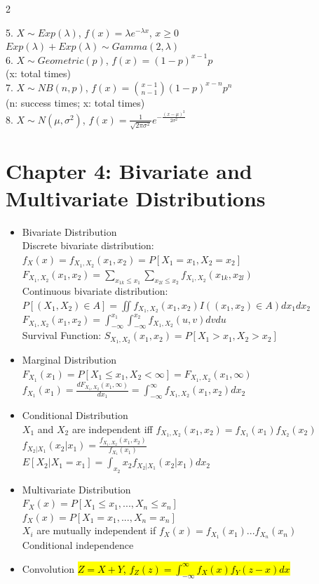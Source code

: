 \documentclass[a4paper,10pt]{article}
\begin{document}
\begin{multicols}{2}
\begin{itemize}
    5. $X\sim Exp(\lambda)$, $f(x)=\lambda e^{-\lambda x}$, $x\ge 0$\\
    $Exp(\lambda)+Exp(\lambda)\sim Gamma(2,\lambda)$\\
    6. $X\sim Geometric(p)$, $f(x)=(1-p)^{x-1}p$\\(x: total times)\\
    7. $X\sim NB(n,p)$, $f(x)=\binom{x-1}{n-1}(1-p)^{x-n}p^n$\\(n: success times; x: total times)\\
    8. $X\sim N(\mu,\sigma^2)$, $f(x)=\frac{1}{\sqrt{2\pi \sigma^2}}e^{-\frac{(x-\mu)^2}{2\sigma^2}}$
\end{itemize}

\section*{Chapter 4: Bivariate and Multivariate Distributions}
\begin{itemize}
    \item Bivariate Distribution\\
    Discrete bivariate distribution: $f_X(x)=f_{X_1,X_2}(x_1,x_2)=P[X_1=x_1,X_2=x_2]$\\
    $F_{X_1,X_2}(x_1,x_2)=\sum_{x_{1k}\le x_1}\sum_{x_{2l}\le x_2}f_{X_1,X_2}(x_{1k},x_{2l})$\\
    Continuous bivariate distribution: $P[(X_1,X_2)\in A]=\iint f_{X_1,X_2}(x_1,x_2)I((x_1,x_2)\in A)dx_1dx_2$\\
    $F_{X_1,X_2}(x_1,x_2)=\int_{-\infty}^{x_1} \int_{-\infty}^{x_2} f_{X_1,X_2}(u,v)dvdu$\\
    Survival Function: $S_{X_1,X_2}(x_1,x_2)=P[X_1>x_1,X_2>x_2]$
    \item Marginal Distribution\\
    $F_{X_1}(x_1)=P[X_1\le x_1,X_2<\infty]=F_{X_1,X_2}(x_1,\infty)$\\
    $f_{X_1}(x_1)=\frac{dF_{X_1,X_2}(x_1,\infty)}{dx_1}=\int_{-\infty}^{\infty}f_{X_1,X_2}(x_1,x_2)dx_2$
    \item Conditional Distribution\\
    $X_1$ and $X_2$ are independent iff $f_{X_1,X_2}(x_1,x_2)=f_{X_1}(x_1)f_{X_2}(x_2)$\\
    $f_{X_2|X_1}(x_2|x_1)=\frac{f_{X_1,X_2}(x_1,x_2)}{f_{X_1}(x_1)}$\\
    $E[X_2|X_1=x_1]=\int_{x_2}x_2f_{X_2|X_1}(x_2|x_1)dx_2$
    \item Multivariate Distribution\\
    $F_X(x)=P[X_1\le x_1,...,X_n\le x_n]$\\
    $f_X(x)=P[X_1= x_1,...,X_n= x_n]$\\
    $X_i$ are mutually independent if $f_X(x)=f_{X_1}(x_1)...f_{X_n}(x_n)$\\
    Conditional independence
    \item Convolution
    \hl{$Z=X+Y$, $f_Z(z)=\int_{-\infty}^\infty f_X(x)f_Y(z-x)dx$}
\end{itemize}


\end{multicols}
\end{document}
